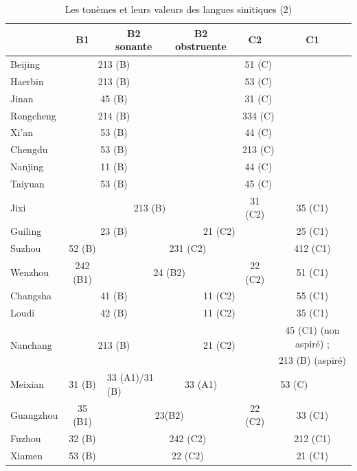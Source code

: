 \documentclass{scrbook}
\newcounter{c}[subsubsection]
\begin{document}
\begin{sloppypar}
\begin{landscape}
\begin{table}[htbp]
  \centering

    \begin{tabular}{l|ccccc}
    \toprule
          & B1    & B2 sonante & B2 obstruente & C2    & C1 \\
    \midrule
    Beijing & \multicolumn{2}{c}{213 (B)} & \multicolumn{3}{c}{51 (C)} \\
    Haerbin & \multicolumn{2}{c}{213 (B)} & \multicolumn{3}{c}{53 (C)} \\
    Jinan & \multicolumn{2}{c}{45 (B)} & \multicolumn{3}{c}{31 (C)} \\
    Rongcheng & \multicolumn{2}{c}{214 (B)} & \multicolumn{3}{c}{334 (C)} \\
    Xi'an & \multicolumn{2}{c}{53 (B)} & \multicolumn{3}{c}{44 (C)} \\
    Chengdu & \multicolumn{2}{c}{53 (B)} & \multicolumn{3}{c}{213 (C)} \\
    Nanjing & \multicolumn{2}{c}{11 (B)} & \multicolumn{3}{c}{44 (C)} \\
    Taiyuan & \multicolumn{2}{c}{53 (B)} & \multicolumn{3}{c}{45 (C)} \\
    Jixi  & \multicolumn{3}{c}{213 (B)} & 31 (C2) & 35 (C1) \\
    Guiling & \multicolumn{2}{c}{23 (B)} & \multicolumn{2}{c}{21 (C2)} & 25 (C1) \\
    Suzhou & 52 (B) & \multicolumn{3}{c}{231 (C2)} & 412 (C1) \\
    Wenzhou & 242 (B1) & \multicolumn{2}{c}{24 (B2)} & 22 (C2) & 51 (C1) \\
    Changsha & \multicolumn{2}{c}{41 (B)} & \multicolumn{2}{c}{11 (C2)} & 55 (C1) \\
    Loudi & \multicolumn{2}{c}{42 (B)} & \multicolumn{2}{c}{11 (C2)} & 35 (C1) \\
    \multirow{2}[0]{*}{Nanchang} & \multicolumn{2}{c}{\multirow{2}[0]{*}{213 (B)}} & \multicolumn{2}{c}{\multirow{2}[0]{*}{21 (C2)}} & 45 (C1) (non aspiré) ; \\
          & \multicolumn{2}{c}{} & \multicolumn{2}{c}{} & 213 (B) (aspiré) \\
    Meixian & 31 (B) & \multicolumn{1}{l}{33 (A1)/31 (B)} & 33 (A1) & \multicolumn{2}{c}{53 (C)} \\
    Guangzhou & 35 (B1) & \multicolumn{2}{c}{23(B2)} & 22 (C2) & 33 (C1) \\
    Fuzhou & 32 (B) & \multicolumn{3}{c}{242 (C2)} & 212 (C1) \\
    Xiamen & 53 (B) & \multicolumn{3}{c}{22 (C2)} & 21 (C1) \\
    \bottomrule
    \end{tabular}%
  \caption{Les tonèmes et leurs valeurs des langues sinitiques (2)}
  \label{tab:ton_valeur2}%
\end{table}%
\end{landscape}


\end{sloppypar}
\end{document}
